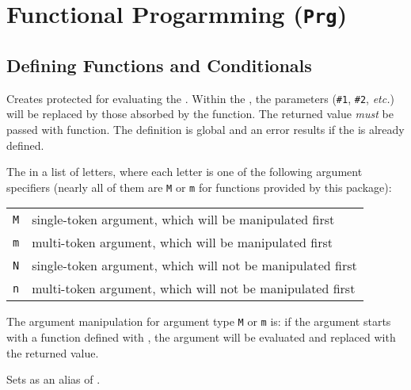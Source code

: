 \documentclass[oneside]{book}
\begin{document}
\chapter{Functional Progarmming (\texttt{Prg})}

\section{Deﬁning Functions and Conditionals}

\begin{function}{\PrgNewFunction}
\begin{syntax}
   
\end{syntax}
Creates protected  for evaluating the .
Within the , the parameters (\verb|#1|, \verb|#2|,
\emph{etc.}) will be replaced by those absorbed by the function.
The returned value \emph{must} be passed with  function.
The definition is global and an error results if the
 is already defined.\par
The  in a list of letters,
where each letter is one of the following argument specifiers
(nearly all of them are \texttt{M} or \texttt{m} for functions provided by this package):\par
{\centering\begin{tabular}{ll}
  \texttt{M} & single-token argument, which will be manipulated first \\
  \texttt{m} & multi-token argument, which will be manipulated first \\
  \texttt{N} & single-token argument, which will not be manipulated first \\
  \texttt{n} & multi-token argument, which will not be manipulated first \\
\end{tabular}\par}
The argument manipulation for argument type \texttt{M} or \texttt{m}
is: if the argument starts with a function defined with ,
the argument will be evaluated and replaced with the returned value.
\end{function}

\begin{function}{\PrgSetEqFunction}
\begin{syntax}
  
\end{syntax}
Sets  as an alias of .
\end{function}
\end{document}
